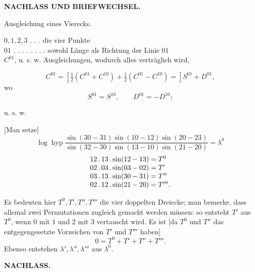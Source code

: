\par\clearpage

\null\thispagestyle{empty}

\par\clearpage

\thispagestyle{empty}
\vspace*{3\baselineskip}
{\centering\Large\bfseries NACHLASS UND BRIEFWECHSEL.\par}
\vspace{3\baselineskip}
{\centering
[1.]\par\smallskip
Ausgleichung eines Vierecks.\par}
\begin{flushleft}
\hspace*{1.8em}\(0,1,2,3\) . . . die vier Punkte\\
\hspace*{1.8em}\(01\) . . . . . . . . sowohl Länge als Richtung der Linie \(01\)\\
\hspace*{1.8em}\(C^{01}\), u. s. w. Ausgleichungen, wodurch alles verträglich wird,
\end{flushleft}
\[
 C^{01}=\left[\tfrac12(C^{01}+C^{10})+\tfrac12(C^{01}-C^{10})=\right]S^{01}+D^{01},
\]
\noindent wo
\[
 S^{01}=S^{10},\qquad D^{01}=-D^{10};
\]
{\centering u. s. w.\par}

[Man setze]
\[
 \log\operatorname{hyp}
 \frac{\sin(30-31)\sin(10-12)\sin(20-23)}
      {\sin(32-30)\sin(13-10)\sin(21-20)}
 =\lambda^0
\]
\[
\begin{array}{@{}r@{\;=\;}l@{}}
 12\,.\,13\,.\sin(12-13)&T^0\\
 02\,.\,03\,.\sin(03-02)&T'\\
 03\,.\,13\,.\sin(30-31)&T''\\
 02\,.\,12\,.\sin(21-20)&T'''.
\end{array}
\]

Es bedeuten hier \(T^0,T',T'',T'''\) die vier doppelten Dreiecke; man bemerke, dass allemal zwei Permutationen zugleich gemacht werden müssen: so entsteht \(T'\) aus \(T^0\), wenn \(0\) mit \(1\) und \(2\) mit \(3\) vertauscht wird. Es ist [da \(T^0\) und \(T''\) das entgegengesetzte Vorzeichen von \(T'\) und \(T'''\) haben]
\[
 0=T^0+T'+T''+T'''.
\]
Ebenso entstehen \(\lambda',\lambda'',\lambda'''\) aus \(\lambda^0\).

\par\clearpage
\noindent{}\hfill{\small\textbf{NACHLASS.}}\hfill\null\par\medskip

